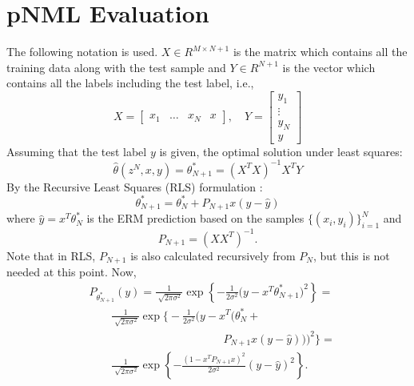 \documentclass[conference,letterpaper]{IEEEtran}
\begin{document}
\section{pNML Evaluation} \label{sec:pNML_eval}
The following notation is used. 
$X \in R^{M \times N+1}$ is the matrix which contains all the training data along with the test sample and $Y \in R^{N+1}$ is the vector which contains all the labels including the test label, i.e.,
\begin{equation}
X = \begin{bmatrix} x_1 & \dots & x_N & x \end{bmatrix}, \;\;\ \ 
Y = \begin{bmatrix} y_1 \\ \vdots \\ y_N \\ y \end{bmatrix}
\end{equation}
Assuming that the test label $y$ is given, the optimal solution under least squares:
\begin{equation}
\hat{\theta}(z^N,x,y) = \theta^*_{N+1} = (X^T X)^{-1} X^T Y
\end{equation}
By the Recursive Least Squares (RLS) formulation \cite{hayes19969}:
\begin{equation} \label{eq:rls_update}
\theta ^*_{N+1} = \theta^*_{N} + P_{N+1} x (y - \hat{y})
\end{equation}
where $\hat{y} = x^T \theta ^*_{N}$ is the ERM prediction based on the samples $\{(x_i, y_i)\}_{i=1}^{N}$ and
\begin{equation}
P_{N+1} = (XX^T)^{-1}. 
\end{equation}
Note that in RLS, $P_{N+1}$ is also calculated recursively from $P_N$, but this is not needed at this point.
Now,
\begin{equation}
\begin{split}
&P_{\theta_{N+1}^*}(y) 
=\frac{1}{\sqrt[]{2\pi\sigma^2}}\exp\left\{-\frac{1}{2\sigma^2}\big(y- x^T\theta_{N+1}^* \big)^2\right\} = \\
& \qquad \frac{1}{\sqrt[]{2\pi\sigma^2}}\exp\bigg\{-\frac{1}{2\sigma^2}\big(y - x^T \big(\theta^*_{N} + \\ 
& \qquad \qquad \qquad \qquad \qquad \qquad P_{N+1} x (y -\hat{y}) \big) \big)^2\bigg\} = \\
& \qquad \frac{1}{\sqrt[]{2\pi\sigma^2}}
\exp\left\{-\frac{(1 - x^T P_{N+1} x )^2 }{2\sigma^2}\left(y-\hat{y} \right)^2\right\}.  \\
\end{split}
\end{equation}
\end{document}
